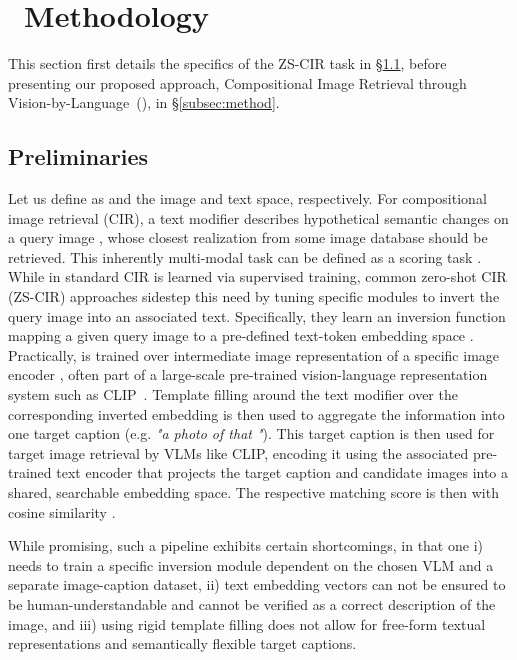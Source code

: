\documentclass{article} \usepackage{iclr2024_conference,times}
\newcommand{\acronym}{{Compositional Image Retrieval through Vision-by-Language}}
\begin{document}
\section{\methodNameNS \ Methodology}
\label{sec:method}
This section first details the specifics of the ZS-CIR task in \S\ref{subsec:prelims}, before presenting our proposed approach, \acronym\ (\methodNameNS), in \S\ref{subsec:method}.

\subsection{Preliminaries}
\label{subsec:prelims}
Let us define as   and  the image and text space, respectively. 
For compositional image retrieval (CIR), a text modifier  describes hypothetical semantic changes on a query image , whose closest realization  from some image database  should be retrieved.
This inherently multi-modal task can be defined as a scoring task . 
While in standard CIR  is learned via supervised training, common zero-shot CIR (ZS-CIR) approaches sidestep this need by tuning specific modules to invert the query image into an associated text. 
Specifically, they learn an inversion function  mapping a given query image to a pre-defined text-token embedding space . 
Practically,  is trained over intermediate image representation of a specific image encoder  \citep{pic2word,searle}, often part of a large-scale pre-trained vision-language representation system such as CLIP~\citep{clip}.
Template filling around the text modifier over the corresponding inverted embedding  is then used to aggregate the information into one target caption (e.g. \textit{"a photo of  that "}). 
This target caption is then used for target image retrieval by VLMs like CLIP, encoding it using the associated pre-trained text encoder  that projects the target caption and candidate images  into a shared, searchable embedding space.
The respective matching score is then  with cosine similarity .

While promising, such a pipeline exhibits certain shortcomings, in that one 
i) needs to train a specific inversion module  dependent on the chosen VLM and a separate image-caption dataset, 
ii) text embedding vectors can not be ensured to be human-understandable and cannot be verified as a correct description of the image, and 
iii) using rigid template filling does not allow for free-form textual representations and semantically flexible target captions.  
\end{document}

